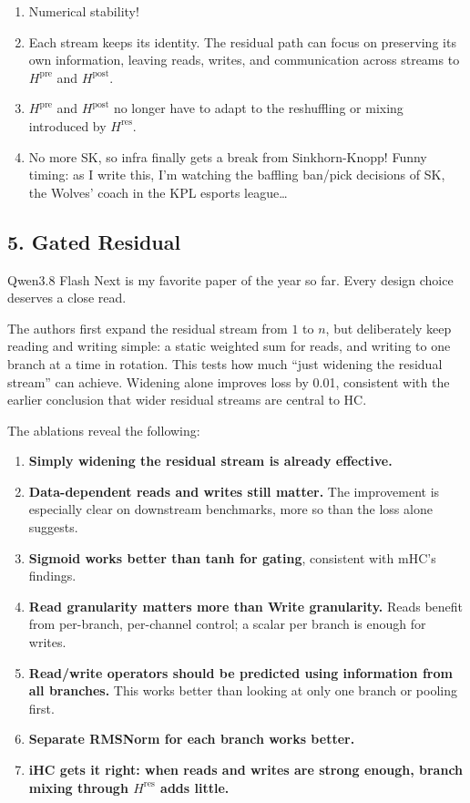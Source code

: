 \documentclass[
  english,
  11pt,
  a4paper,
]{article}
\begin{document}
\begin{enumerate}
\def\labelenumi{\arabic{enumi}.}
\item
  Numerical stability!
\item
  Each stream keeps its identity. The residual path can focus on
  preserving its own information, leaving reads, writes, and
  communication across streams to \(H^{\mathrm{pre}}\) and
  \(H^{\mathrm{post}}\).
\item
  \(H^{\mathrm{pre}}\) and \(H^{\mathrm{post}}\) no longer have to adapt
  to the reshuffling or mixing introduced by \(H^{\mathrm{res}}\).
\item
  No more SK, so infra finally gets a break from Sinkhorn-Knopp! Funny
  timing: as I write this, I'm watching the baffling ban/pick decisions
  of SK, the Wolves' coach in the KPL esports league\ldots{}
\end{enumerate}

\clearpage

\endgroup

\subsection{5. Gated Residual}\label{gated-residual}

Qwen3.8 Flash Next is my favorite paper of the year so far. Every design
choice deserves a close read.

The authors first expand the residual stream from \(1\) to \(n\), but
deliberately keep reading and writing simple: a static weighted sum for
reads, and writing to one branch at a time in rotation. This tests how
much ``just widening the residual stream'' can achieve. Widening alone
improves loss by 0.01, consistent with the earlier conclusion that wider
residual streams are central to HC.

The ablations reveal the following:

\begin{enumerate}
\def\labelenumi{\arabic{enumi}.}
\item
  \textbf{Simply widening the residual stream is already effective.}
\item
  \textbf{Data-dependent reads and writes still matter.} The improvement
  is especially clear on downstream benchmarks, more so than the loss
  alone suggests.
\item
  \textbf{Sigmoid works better than tanh for gating}, consistent with
  mHC's findings.
\item
  \textbf{Read granularity matters more than Write granularity.} Reads
  benefit from per-branch, per-channel control; a scalar per branch is
  enough for writes.
\item
  \textbf{Read/write operators should be predicted using information
  from all branches.} This works better than looking at only one branch
  or pooling first.
\item
  \textbf{Separate RMSNorm for each branch works better.}
\item
  \textbf{iHC gets it right: when reads and writes are strong enough,
  branch mixing through \(H^{\mathrm{res}}\) adds little.}
\end{enumerate}
\end{document}
